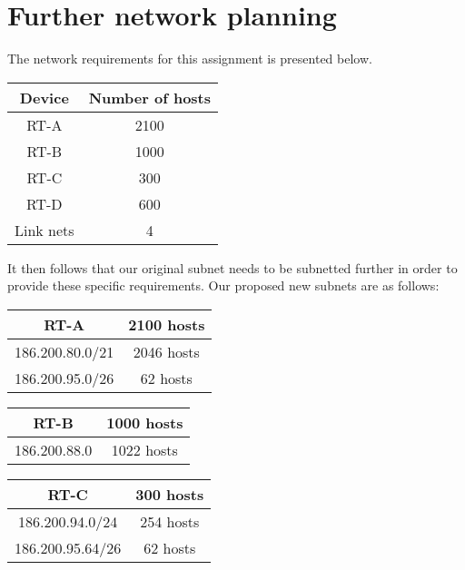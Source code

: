\documentclass[a4paper, titlepage,12pt]{article}
\begin{document}
	\section{Further network planning}

		The network requirements for this assignment is presented below.

		\begin{center}
			\begin{tabular}{|c|c|}
				\hline
				\textbf{Device} & \textbf{Number of hosts} \\
				\hline
				RT-A & 2100 \\
				\hline
				RT-B & 1000 \\
				\hline
				RT-C & 300 \\
				\hline
				RT-D & 600 \\
				\hline
				Link nets & 4 \\
				\hline
			\end{tabular}
		\end{center}

		It then follows that our original subnet needs to be subnetted further in order to provide these specific requirements.
		Our proposed new subnets are as follows:

		\begin{center}
			\begin{tabular}{|c|c|}
				\hline
				RT-A & 2100 hosts \\
				\hline
				186.200.80.0/21 & 2046 hosts \\
				\hline
				186.200.95.0/26 & 62 hosts \\
				\hline
			\end{tabular}
		\end{center}

		\begin{center}
			\begin{tabular}{|c|c|}
				\hline
				RT-B & 1000 hosts \\
				\hline
				186.200.88.0 & 1022 hosts \\
				\hline
			\end{tabular}
		\end{center}

		\begin{center}
			\begin{tabular}{|c|c|}
				\hline
				RT-C & 300 hosts \\
				\hline
				186.200.94.0/24 & 254 hosts \\
				\hline
				186.200.95.64/26 & 62 hosts \\
				\hline
			\end{tabular}
		\end{center}
\end{document}
